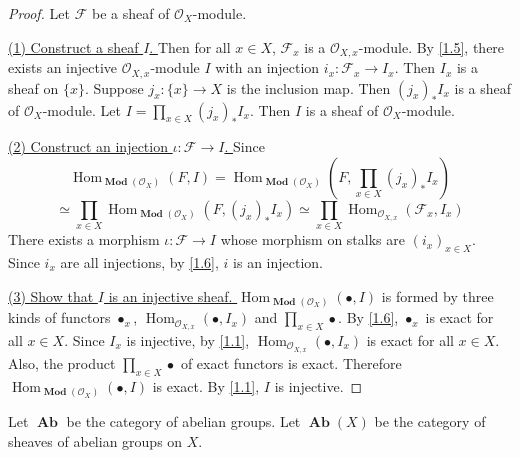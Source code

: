 \documentclass{amsart}
\numberwithin{equation}{section}
\theoremstyle{plain}
\theoremstyle{definition}
\DeclareMathOperator{\Ab}{\mathbf{Ab}}
\DeclareMathOperator{\Hom}{Hom}
\DeclareMathOperator{\Mod}{\mathbf{Mod}}
\begin{document}
\begin{proof}
	Let $ \mathscr F $ be a sheaf of $ \mathcal O_X $-module. 
	
	\underline{(1) Construct a sheaf $ I $. }
	Then for all $ x\in X $, $ \mathscr F_x $ is a $ \mathcal O_{X,x} $-module. 
	By \cref{1.5}, there exists an injective $ \mathcal O_{X,x} $-module $ I $ with an injection $ i_x:\mathscr F_x\to I_x $. 
	Then $ I_x $ is a sheaf on $ \{x\} $. 
	Suppose $ j_x:\{x\}\to X $ is the inclusion map. 
	Then $ (j_x)_*I_x $ is a sheaf of $ \mathcal O_X $-module. 
	Let $ I=\prod\limits_{x\in X}(j_x)_*I_x $. 
	Then $ I $ is a sheaf of $ \mathcal O_X $-module. 
	
	\underline{(2) Construct an injection $ \iota: \mathscr F\to I $. }
	Since $$\Hom_{\Mod(\mathcal{O}_X)}(F, I)=\Hom_{\Mod(\mathcal{O}_X)}(F, \prod\limits_{x\in X}(j_x)_*I_x)$$ $$\simeq \prod\limits_{x\in X}\Hom_{\Mod(\mathcal{O}_X)}(F, (j_x)_*I_x)\simeq \prod\limits_{x\in X}\Hom_{\mathcal O_{X,x}}(\mathscr F_x, I_x)$$
	There exists a morphism $ \iota:\mathscr F\to I $ whose morphism on stalks are $ (i_x)_{x\in X} $. 
	Since $ i_x $ are all injections, by \cref{1.6}, $ i $ is an injection. 
	
	
	\underline{(3) Show that $ I $ is an injective sheaf. }
	$ \Hom_{\Mod(\mathcal{O}_X)}(\bullet, I) $ is formed by three kinds of functors $ \bullet_x $, $ \Hom_{\mathcal O_{X,x}}(\bullet, I_x) $ and $ \prod\limits_{x\in X}\bullet $. 
	By \cref{1.6}, $ \bullet_x $ is exact for all $ x\in X $. 
	Since $ I_x $ is injective, by \cref{1.1}, $ \Hom_{\mathcal O_{X,x}}(\bullet, I_x) $ is exact for all $ x\in X $. 
	Also, the product $ \prod\limits_{x\in X}\bullet  $ of exact functors is exact. 
	Therefore $ \Hom_{\Mod(\mathcal{O}_X)}(\bullet, I) $ is exact. 
	By \cref{1.1}, $ I $ is injective. 
\end{proof}

Let $ \Ab $ be the category of abelian groups. 
Let $ \Ab(X) $ be the category of sheaves of abelian groups on $ X $. 
\end{document}
